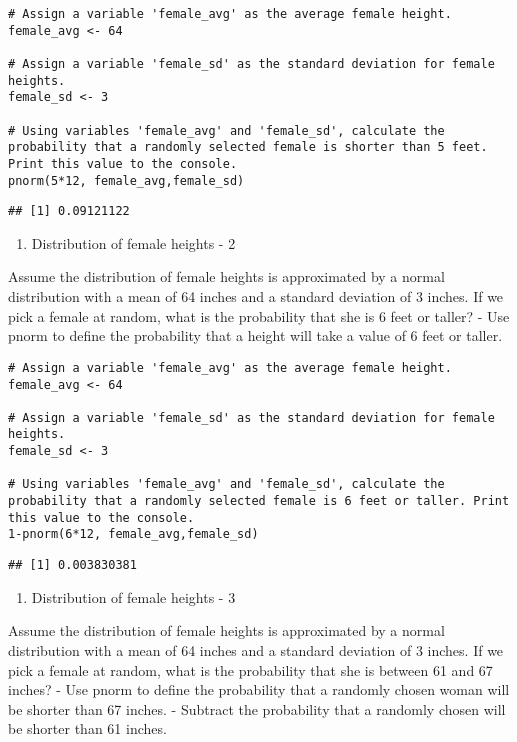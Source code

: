 \documentclass[
]{article}
\providecommand{\tightlist}{%
  \setlength{\itemsep}{0pt}\setlength{\parskip}{0pt}}
\begin{document}
\begin{verbatim}
# Assign a variable 'female_avg' as the average female height.
female_avg <- 64

# Assign a variable 'female_sd' as the standard deviation for female heights.
female_sd <- 3

# Using variables 'female_avg' and 'female_sd', calculate the probability that a randomly selected female is shorter than 5 feet. Print this value to the console.
pnorm(5*12, female_avg,female_sd)
\end{verbatim}

\begin{verbatim}
## [1] 0.09121122
\end{verbatim}

\begin{enumerate}
\def\labelenumi{\arabic{enumi}.}
\setcounter{enumi}{1}
\tightlist
\item
  Distribution of female heights - 2
\end{enumerate}

Assume the distribution of female heights is approximated by a normal
distribution with a mean of 64 inches and a standard deviation of 3
inches. If we pick a female at random, what is the probability that she
is 6 feet or taller? - Use pnorm to define the probability that a height
will take a value of 6 feet or taller.

\begin{verbatim}
# Assign a variable 'female_avg' as the average female height.
female_avg <- 64

# Assign a variable 'female_sd' as the standard deviation for female heights.
female_sd <- 3

# Using variables 'female_avg' and 'female_sd', calculate the probability that a randomly selected female is 6 feet or taller. Print this value to the console.
1-pnorm(6*12, female_avg,female_sd)
\end{verbatim}

\begin{verbatim}
## [1] 0.003830381
\end{verbatim}

\begin{enumerate}
\def\labelenumi{\arabic{enumi}.}
\setcounter{enumi}{2}
\tightlist
\item
  Distribution of female heights - 3
\end{enumerate}

Assume the distribution of female heights is approximated by a normal
distribution with a mean of 64 inches and a standard deviation of 3
inches. If we pick a female at random, what is the probability that she
is between 61 and 67 inches? - Use pnorm to define the probability that
a randomly chosen woman will be shorter than 67 inches. - Subtract the
probability that a randomly chosen will be shorter than 61 inches.
\end{document}
